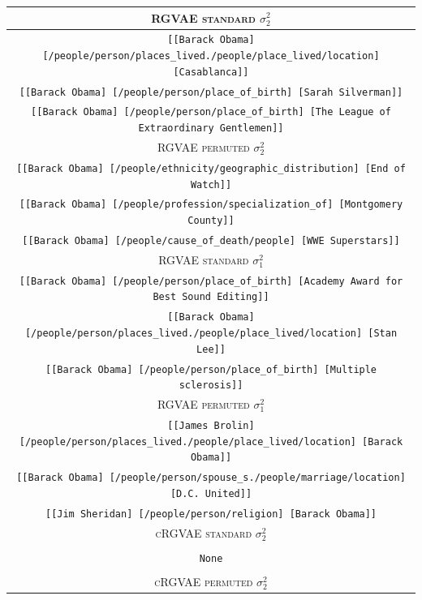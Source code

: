 \begin{table}[H]
  \begin{tabular}{|c|}
  \hline
  \rowcolor[HTML]{EFEFEF} 
  \textsc{RGVAE standard} $\sigma_2^2$\\ \hline
  \texttt{[[Barack Obama]	[/people/person/places\_lived./people/place\_lived/location]	[Casablanca]]}\\
  \texttt{[[Barack Obama]	[/people/person/place\_of\_birth]	[Sarah Silverman]]}\\
  \texttt{[[Barack Obama]	[/people/person/place\_of\_birth]	[The League of Extraordinary Gentlemen]]}\\ \hline
  \rowcolor[HTML]{EFEFEF} 
  \textsc{RGVAE permuted} $\sigma_2^2$\\ \hline
  \texttt{[[Barack Obama]	[/people/ethnicity/geographic\_distribution]	[End of Watch]]}\\
  \texttt{[[Barack Obama]	[/people/profession/specialization\_of]	[Montgomery County]]}\\
  \texttt{[[Barack Obama]	[/people/cause\_of\_death/people]	[WWE Superstars]]}\\ \hline
  \rowcolor[HTML]{EFEFEF} 
  \textsc{RGVAE standard} $\sigma_1^2$\\ \hline
  \texttt{[[Barack Obama]	[/people/person/place\_of\_birth]	[Academy Award for Best Sound Editing]]}\\
  \texttt{[[Barack Obama]	[/people/person/places\_lived./people/place\_lived/location]	[Stan Lee]]}\\
  \texttt{[[Barack Obama]	[/people/person/place\_of\_birth]	[Multiple sclerosis]]}\\ \hline
  \rowcolor[HTML]{EFEFEF} 
  \textsc{RGVAE permuted} $\sigma_1^2$\\ \hline
  \texttt{[[James Brolin]	[/people/person/places\_lived./people/place\_lived/location]	[Barack Obama]]}\\
  \texttt{[[Barack Obama]	[/people/person/spouse\_s./people/marriage/location]	[D.C. United]]}\\
  \texttt{[[Jim Sheridan]	[/people/person/religion]	[Barack Obama]]}\\ \hline
  \rowcolor[HTML]{EFEFEF} 
  \textsc{cRGVAE standard} $\sigma_2^2$\\ \hline
  \texttt{}\\
  \texttt{None}\\
  \texttt{}\\ \hline
  \rowcolor[HTML]{EFEFEF} 
  \textsc{cRGVAE permuted} $\sigma_2^2$\\ \hline

\end{tabular}
\end{table}
